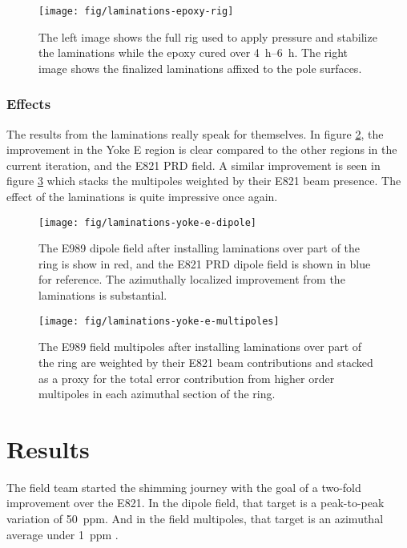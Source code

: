 \begin{figure}
\label{fig:laminations-epoxy-rig}
\texttt{[image: fig/laminations-epoxy-rig]}
\caption{The left image shows the full rig used to apply pressure and stabilize the laminations while the epoxy cured over \SIrange{4}{6}{\hour}.  The right image shows the finalized laminations affixed to the pole surfaces.}
\end{figure}

\subsubsection{Effects}

The results from the laminations really speak for themselves.  In figure \ref{fig:laminations-yoke-e-dipole}, the improvement in the Yoke E region is clear compared to the other regions in the current iteration, and the E821 PRD field.  A similar improvement is seen in figure \ref{fig:laminations-yoke-e-multipoles} which stacks the multipoles weighted by their E821 beam presence.  The effect of the laminations is quite impressive once again.

\begin{figure}
\label{fig:laminations-yoke-e-dipole}
\texttt{[image: fig/laminations-yoke-e-dipole]}
\caption{The E989 dipole field after installing laminations over part of the ring is show in red, and the E821 PRD dipole field is shown in blue for reference.  The azimuthally localized improvement from the laminations is substantial.}
\end{figure}

\begin{figure}
\label{fig:laminations-yoke-e-multipoles}
\texttt{[image: fig/laminations-yoke-e-multipoles]}
\caption{The E989 field multipoles after installing laminations over part of the ring are weighted by their E821 beam contributions and stacked as a proxy for the total error contribution from higher order multipoles in each azimuthal section of the ring.}
\end{figure}

\section{Results}

The field team started the shimming journey with the goal of a two-fold improvement over the E821.  In the dipole field, that target is a peak-to-peak variation of \SI{50}{ppm}. And in the field multipoles, that target is an azimuthal average under \SI{1}{ppm} .


